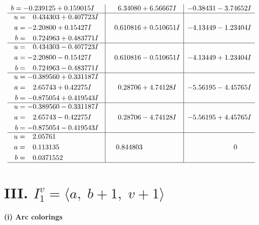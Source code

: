 \documentclass[1p]{elsarticle_modified}
\theoremstyle{definition}
\begin{document}
$$\begin{array}{c|c|c}
\begin{aligned}
b &= -0.239125 + 0.159015 I\end{aligned}
 & \phantom{-}6.34080 + 6.56667 I & -0.38431 - 3.74652 I \\ \hline\begin{aligned}
u &= \phantom{-}0.434303 + 0.407723 I \\
a &= -2.20800 + 0.15427 I \\
b &= \phantom{-}0.724963 + 0.483771 I\end{aligned}
 & \phantom{-}0.610816 + 0.510651 I & -4.13449 - 1.23404 I \\ \hline\begin{aligned}
u &= \phantom{-}0.434303 - 0.407723 I \\
a &= -2.20800 - 0.15427 I \\
b &= \phantom{-}0.724963 - 0.483771 I\end{aligned}
 & \phantom{-}0.610816 - 0.510651 I & -4.13449 + 1.23404 I \\ \hline\begin{aligned}
u &= -0.389560 + 0.331187 I \\
a &= \phantom{-}2.65743 + 0.42275 I \\
b &= -0.875054 + 0.419543 I\end{aligned}
 & \phantom{-}0.28706 + 4.74128 I & -5.56195 - 4.45765 I \\ \hline\begin{aligned}
u &= -0.389560 - 0.331187 I \\
a &= \phantom{-}2.65743 - 0.42275 I \\
b &= -0.875054 - 0.419543 I\end{aligned}
 & \phantom{-}0.28706 - 4.74128 I & -5.56195 + 4.45765 I \\ \hline\begin{aligned}
u &= \phantom{-}2.05761\phantom{ +0.000000I} \\
a &= \phantom{-}0.113135\phantom{ +0.000000I} \\
b &= \phantom{-}0.0371552\phantom{ +0.000000I}\end{aligned}
 & \phantom{-}0.844803\phantom{ +0.000000I} & \phantom{-0.000000 } 0\\
 \hline 
 \end{array}$$\newpage\newpage\renewcommand{\arraystretch}{1}
\centering \section*{III. $I^v_{1}= \langle a,\;b+1,\;v+1 \rangle$}
\flushleft \textbf{(i) Arc colorings}\\
\end{document}

